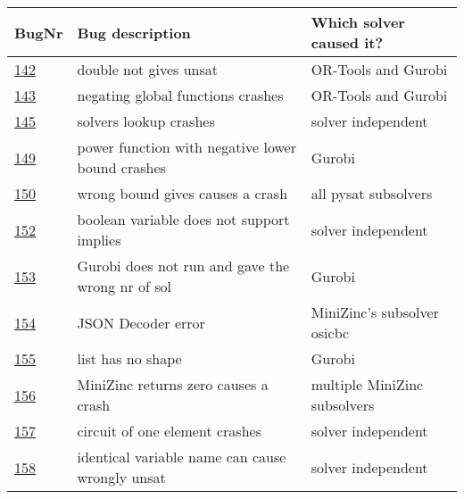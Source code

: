 \begin{table}[]
	\centering
	\begin{tabular}{lll}
		BugNr & Bug description                                           & Which solver caused it?\\ \toprule
		\href{https://github.com/CPMpy/cpmpy/issues/142}{142}   & double not gives unsat                                    & OR-Tools and Gurobi                            \\
		\href{https://github.com/CPMpy/cpmpy/issues/143}{143}   & negating global functions crashes                         & OR-Tools and Gurobi                            \\
		\href{https://github.com/CPMpy/cpmpy/issues/145}{145}   & solvers lookup crashes                                    & solver independent                             \\
		\href{https://github.com/CPMpy/cpmpy/issues/149}{149}   & power function with negative lower bound crashes          & Gurobi                                         \\
		\href{https://github.com/CPMpy/cpmpy/issues/150}{150}   & wrong bound gives causes a crash                          & all pysat subsolvers                           \\
		\href{https://github.com/CPMpy/cpmpy/issues/152}{152}   & boolean variable does not support implies                 & solver independent                             \\
		\href{https://github.com/CPMpy/cpmpy/issues/153}{153}   & Gurobi does not run and gave the wrong nr of sol         & Gurobi                                         \\
		\href{https://github.com/CPMpy/cpmpy/issues/154}{154}   & JSON Decoder error                                        & MiniZinc's subsolver osicbc                    \\
		\href{https://github.com/CPMpy/cpmpy/issues/155}{155}   & list has no shape                                         & Gurobi                                         \\
		\href{https://github.com/CPMpy/cpmpy/issues/156}{156}   & MiniZinc returns zero causes a crash                      & multiple MiniZinc subsolvers                   \\
		\href{https://github.com/CPMpy/cpmpy/issues/157}{157}   & circuit of one element crashes                            & solver independent                             \\
		\href{https://github.com/CPMpy/cpmpy/issues/158}{158}   & identical variable name can cause wrongly unsat           & solver independent                             \\

\end{tabular}
\end{table}
